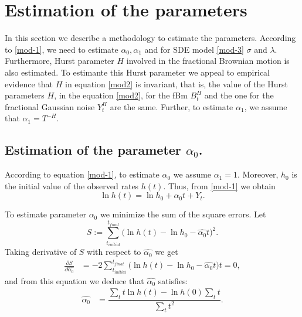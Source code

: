 \documentclass[smallextended]{svjour3}
\begin{document}
\section{Estimation of the parameters}
    \label{esti}
        In this section we describe a methodology to estimate the 
    parameters. According to \eqref{mod-1}, we need to estimate 
    $\alpha_0, \alpha_1$ and for SDE model \eqref{mod-3}
    $\sigma$ and $\lambda$. Furthermore, Hurst parameter $H$ involved in the 
    fractional Brownian motion is also estimated. To estimante this Hurst 
    parameter we  appeal to empirical evidence that $H$
    in equation \eqref{mod2} is invariant, that is, the  value of the
    Hurst parameters $H$, in the equation \eqref{mod2}, for the fBm $B_t^H$ and
    the one for the fractional Gaussian noise $Y_t^H$ are the same. Further, to 
    estimate $\alpha_1$, we assume that
    $\alpha_1=T^{-H}$.

    \subsection{Estimation of the parameter $\alpha_0$.}
%
%
    According to equation \eqref{mod-1}, to estimate
    $\alpha_0$ we assume $\alpha_1=1$. Moreover, $h_0$ is the initial 
    value of the observed rates $h(t)$. Thus, from \eqref{mod-1} we obtain
    \begin{equation}
        \ln h(t)=\ln h_0+\alpha_0t+Y_t. \label{mod-ln}
    \end{equation}
    
    To estimate parameter $\alpha_0$ we minimize the 
    sum of the square errors.
    Let 
    \begin{equation*}
        S:= 
            \sum_{t_{initial}}^{t_{final}} \Big( \ln h(t)-\ln 
            h_0-\widehat{\alpha_0} t
        \Big)^2. 
    \end{equation*}
    Taking derivative of $S$ with respect
    to $\widehat{\alpha_0}$  we get
    \begin{align*}
        \frac{\partial S}{\partial \widehat{\alpha_0}}&=
            -2 \sum_{t_{initial}} ^ {t_{final}} 
            \Big( 
                \ln h(t)-\ln h_0-\widehat{\alpha_0} t
            \Big) t =0, %
    \end{align*}
    and from this equation we deduce that  $\widehat{\alpha_0}$
    satisfies:
    \begin{align}
        \widehat{\alpha_0} 
            &= 
            \dfrac{
                \sum_{t} t 
                \ln h(t) 
                - 
                \ln h(0)
                \sum_{t} t
            }{
                \sum_{t} t^2
            }. \label{alpha0}
    \end{align}
\end{document}
